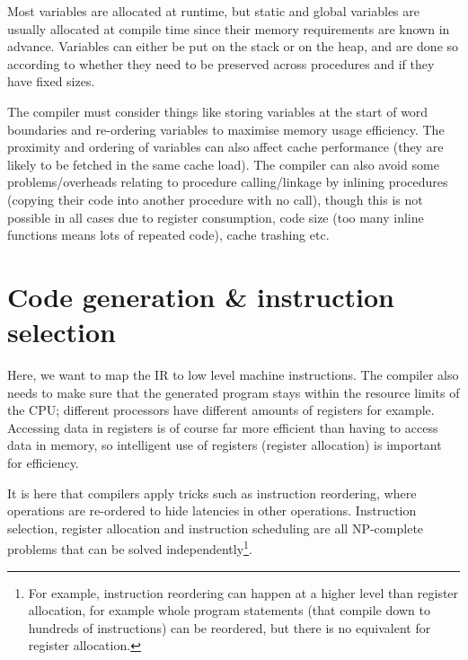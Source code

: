 Most variables are allocated at runtime, but static and global
variables are usually allocated at compile time since their memory
requirements are known in advance. Variables can either be put on the
stack or on the heap, and are done so according to whether they need
to be preserved across procedures and if they have fixed sizes.


The compiler must consider things like storing variables at the start
of word boundaries and re-ordering variables to maximise memory usage
efficiency. The proximity and ordering of variables can also affect
cache performance (they are likely to be fetched in the same cache
load). The compiler can also avoid some problems/overheads relating to
procedure calling/linkage by inlining procedures (copying their code
into another procedure with no call), though this is not possible in
all cases due to register consumption, code size (too many inline
functions means lots of repeated code), cache trashing etc.




\section{Code generation \& instruction selection}

Here, we want to map the IR to low level machine instructions. The
compiler also needs to make sure that the generated program stays
within the resource limits of the CPU; different processors have
different amounts of registers for example. Accessing data in
registers is of course far more efficient than having to access data
in memory, so intelligent use of registers (register allocation) is
important for efficiency.

It is here that compilers apply tricks such as instruction reordering,
where operations are re-ordered to hide latencies in other
operations. Instruction selection, register allocation and instruction
scheduling are all NP-complete problems that can be solved
independently\footnote{For example, instruction reordering can happen
at a higher level than register allocation, for example whole program
statements (that compile down to hundreds of instructions) can be
reordered, but there is no equivalent for register allocation.}.

